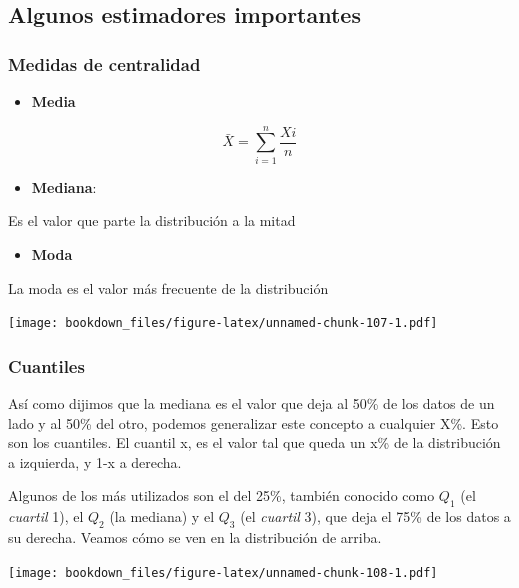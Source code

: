 \documentclass[]{book}
\providecommand{\tightlist}{%
  \setlength{\itemsep}{0pt}\setlength{\parskip}{0pt}}
\begin{document}
\hypertarget{algunos-estimadores-importantes}{%
\subsection{Algunos estimadores importantes}\label{algunos-estimadores-importantes}}

\hypertarget{medidas-de-centralidad}{%
\subsubsection{Medidas de centralidad}\label{medidas-de-centralidad}}

\begin{itemize}
\tightlist
\item
  \textbf{Media}
\end{itemize}

\[
\bar{X}= \sum_{i=1}^n \frac{Xi}{n}
\]

\begin{itemize}
\tightlist
\item
  \textbf{Mediana}:
\end{itemize}

Es el valor que parte la distribución a la mitad

\begin{itemize}
\tightlist
\item
  \textbf{Moda}
\end{itemize}

La moda es el valor más frecuente de la distribución

\texttt{[image: bookdown\_files/figure-latex/unnamed-chunk-107-1.pdf]}

\hypertarget{cuantiles}{%
\subsubsection{Cuantiles}\label{cuantiles}}

Así como dijimos que la mediana es el valor que deja al 50\% de los datos de un lado y al 50\% del otro, podemos generalizar este concepto a cualquier X\%. Esto son los cuantiles. El cuantil x, es el valor tal que queda un x\% de la distribución a izquierda, y 1-x a derecha.

Algunos de los más utilizados son el del 25\%, también conocido como \(Q_1\) (el \emph{cuartil} 1), el \(Q_2\) (la mediana) y el \(Q_3\) (el \emph{cuartil} 3), que deja el 75\% de los datos a su derecha. Veamos cómo se ven en la distribución de arriba.

\texttt{[image: bookdown\_files/figure-latex/unnamed-chunk-108-1.pdf]}
\end{document}

